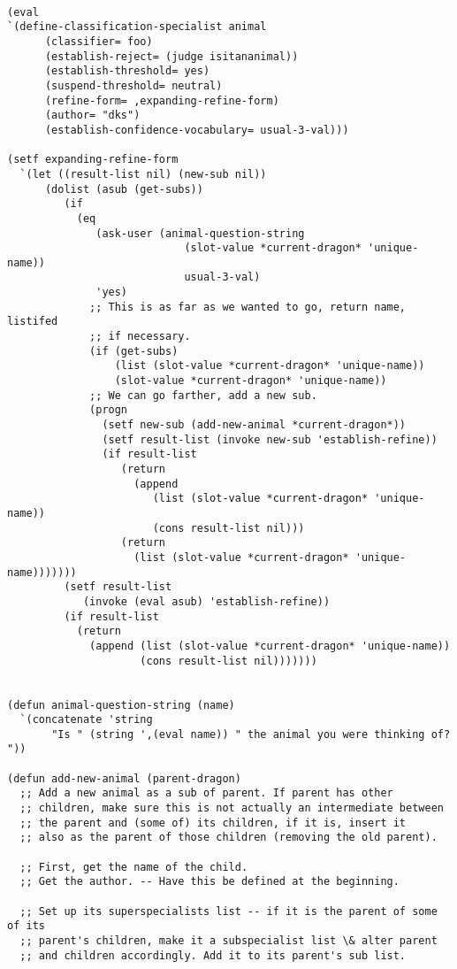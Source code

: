 \begin{verbatim}

(eval 
`(define-classification-specialist animal 
      (classifier= foo)
      (establish-reject= (judge isitananimal))
      (establish-threshold= yes)
      (suspend-threshold= neutral)
      (refine-form= ,expanding-refine-form)
      (author= "dks")
      (establish-confidence-vocabulary= usual-3-val)))

(setf expanding-refine-form
  `(let ((result-list nil) (new-sub nil))
      (dolist (asub (get-subs))
         (if 
           (eq 
              (ask-user (animal-question-string
                            (slot-value *current-dragon* 'unique-name))
                            usual-3-val)
              'yes)
             ;; This is as far as we wanted to go, return name, listifed
             ;; if necessary.
             (if (get-subs)
                 (list (slot-value *current-dragon* 'unique-name))
                 (slot-value *current-dragon* 'unique-name))
             ;; We can go farther, add a new sub.
             (progn
               (setf new-sub (add-new-animal *current-dragon*))
               (setf result-list (invoke new-sub 'establish-refine))
               (if result-list
                  (return
                    (append
                       (list (slot-value *current-dragon* 'unique-name))
                       (cons result-list nil)))
                  (return
                    (list (slot-value *current-dragon* 'unique-name)))))))
         (setf result-list
            (invoke (eval asub) 'establish-refine))
         (if result-list
           (return 
             (append (list (slot-value *current-dragon* 'unique-name))
                     (cons result-list nil)))))))


(defun animal-question-string (name)
  `(concatenate 'string
       "Is " (string ',(eval name)) " the animal you were thinking of? "))

(defun add-new-animal (parent-dragon)
  ;; Add a new animal as a sub of parent. If parent has other
  ;; children, make sure this is not actually an intermediate between
  ;; the parent and (some of) its children, if it is, insert it
  ;; also as the parent of those children (removing the old parent).

  ;; First, get the name of the child.
  ;; Get the author. -- Have this be defined at the beginning.

  ;; Set up its superspecialists list -- if it is the parent of some of its
  ;; parent's children, make it a subspecialist list \& alter parent
  ;; and children accordingly. Add it to its parent's sub list.


\end{verbatim}
